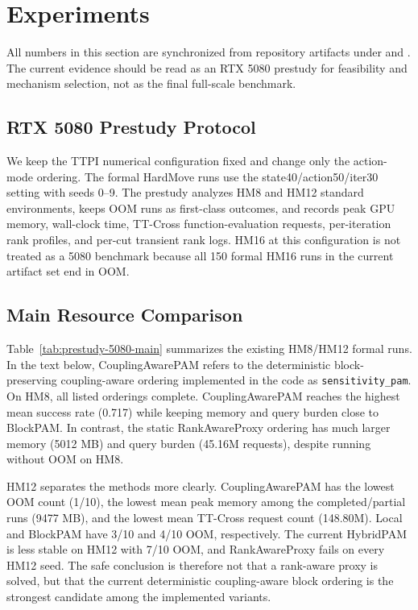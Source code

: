 \section{Experiments}

All numbers in this section are synchronized from repository artifacts under
 and . The current
evidence should be read as an RTX 5080 prestudy for feasibility and mechanism
selection, not as the final full-scale benchmark.

\subsection{RTX 5080 Prestudy Protocol}

We keep the TTPI numerical configuration fixed and change only the action-mode
ordering. The formal HardMove runs use the state40/action50/iter30 setting with
seeds 0--9. The prestudy analyzes HM8 and HM12 standard environments, keeps OOM
runs as first-class outcomes, and records peak GPU memory, wall-clock time,
TT-Cross function-evaluation requests, per-iteration rank profiles, and
per-cut transient rank logs. HM16 at this configuration is not treated as a
5080 benchmark because all 150 formal HM16 runs in the current artifact set end
in OOM.

\subsection{Main Resource Comparison}

Table~\ref{tab:prestudy-5080-main} summarizes the existing HM8/HM12 formal
runs. In the text below, CouplingAwarePAM refers to the deterministic
block-preserving coupling-aware ordering implemented in the code as
\texttt{sensitivity\_pam}. On HM8, all listed orderings complete.
CouplingAwarePAM reaches the highest mean success rate (0.717) while keeping
memory and query burden close to BlockPAM. In contrast, the static
RankAwareProxy ordering has much larger memory (5012 MB) and query burden
(45.16M requests), despite running without OOM on HM8.

HM12 separates the methods more clearly. CouplingAwarePAM has the lowest OOM
count (1/10), the lowest mean peak memory among the completed/partial runs
(9477 MB), and the lowest mean TT-Cross request count (148.80M). Local and
BlockPAM have 3/10 and 4/10 OOM, respectively. The current HybridPAM is less
stable on HM12 with 7/10 OOM, and RankAwareProxy fails on every HM12 seed. The
safe conclusion is therefore not that a rank-aware proxy is solved, but that the
current deterministic coupling-aware block ordering is the strongest
candidate among the implemented variants.

